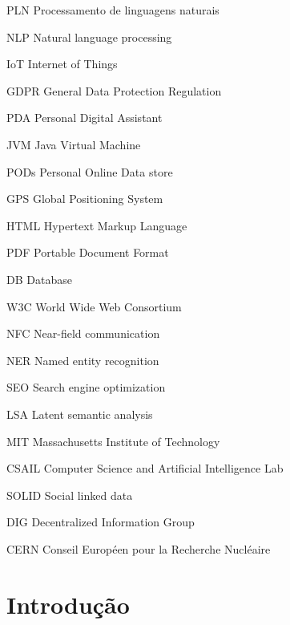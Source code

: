 \documentclass[
	12pt,				%
	openright,			%
	twoside,			%
	a4paper,			%
	english,			%
	french,				%
	spanish,			%
	brazil				%
	]{abntex2}
\begin{document}
\begin{siglas}
    \item[PLN] Processamento de linguagens naturais
    \item[NLP] Natural language processing
    \item[IoT] Internet of Things
    \item[GDPR] General Data Protection Regulation
    \item[PDA] Personal Digital Assistant
    \item[JVM] Java Virtual Machine
    \item[PODs] Personal Online Data store
    \item[GPS] Global Positioning System
    \item[HTML] Hypertext Markup Language
    \item[PDF] Portable Document Format
    \item[DB] Database
    \item[W3C] World Wide Web Consortium
    \item[NFC] Near-field communication
    \item[NER] Named entity recognition
    \item[SEO] Search engine optimization
    \item[LSA] Latent semantic analysis
    \item[MIT] Massachusetts Institute of Technology
    \item[CSAIL] Computer Science and Artificial Intelligence Lab
    \item[SOLID] Social linked data
    \item[DIG] Decentralized Information Group
    \item[CERN] Conseil Européen pour la Recherche Nucléaire
\end{siglas}

\tableofcontents*
\cleardoublepage



\textual

\part{Introdução}
\end{document}
